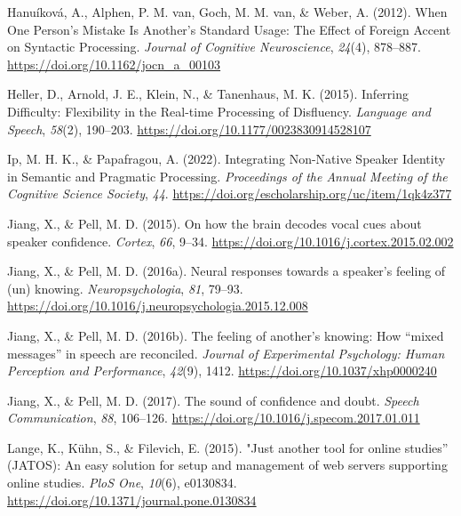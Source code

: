 \documentclass[
  man,floatsintext]{apa7}
\newlength{\cslhangindent}
\newlength{\cslentryspacingunit} %
\newenvironment{CSLReferences}[2] %
 {%
  \setlength{\parindent}{0pt}
  \ifodd #1
  \let\oldpar\par
  \def\par{\hangindent=\cslhangindent\oldpar}
  \fi
  \setlength{\parskip}{#2\cslentryspacingunit}
 }%
 {}
\begin{document}
\begin{CSLReferences}{1}{0}
\leavevmode{}%
Hanuíková, A., Alphen, P. M. van, Goch, M. M. van, \& Weber, A. (2012). When {O}ne {P}erson's {M}istake {I}s {A}nother's {S}tandard {U}sage: {T}he {E}ffect of {F}oreign {A}ccent on {S}yntactic {P}rocessing. \emph{Journal of Cognitive Neuroscience}, \emph{24}(4), 878--887. \url{https://doi.org/10.1162/jocn_a_00103}

\leavevmode{}%
Heller, D., Arnold, J. E., Klein, N., \& Tanenhaus, M. K. (2015). Inferring {D}ifficulty: {F}lexibility in the {R}eal-time {P}rocessing of {D}isfluency. \emph{Language and Speech}, \emph{58}(2), 190--203. \url{https://doi.org/10.1177/0023830914528107}

\leavevmode{}%
Ip, M. H. K., \& Papafragou, A. (2022). Integrating {N}on-{N}ative {S}peaker {I}dentity in {S}emantic and {P}ragmatic {P}rocessing. \emph{Proceedings of the Annual Meeting of the Cognitive Science Society}, \emph{44}. \url{https://doi.org/escholarship.org/uc/item/1qk4z377}

\leavevmode{}%
Jiang, X., \& Pell, M. D. (2015). On how the brain decodes vocal cues about speaker confidence. \emph{Cortex}, \emph{66}, 9--34. \url{https://doi.org/10.1016/j.cortex.2015.02.002}

\leavevmode{}%
Jiang, X., \& Pell, M. D. (2016a). Neural responses towards a speaker's feeling of (un) knowing. \emph{Neuropsychologia}, \emph{81}, 79--93. \url{https://doi.org/10.1016/j.neuropsychologia.2015.12.008}

\leavevmode{}%
Jiang, X., \& Pell, M. D. (2016b). The feeling of another's knowing: How {``mixed messages''} in speech are reconciled. \emph{Journal of Experimental Psychology: Human Perception and Performance}, \emph{42}(9), 1412. \url{https://doi.org/10.1037/xhp0000240}

\leavevmode{}%
Jiang, X., \& Pell, M. D. (2017). The sound of confidence and doubt. \emph{Speech Communication}, \emph{88}, 106--126. \url{https://doi.org/10.1016/j.specom.2017.01.011}

\leavevmode{}%
Lange, K., Kühn, S., \& Filevich, E. (2015). "{J}ust another tool for online studies'' (JATOS): An easy solution for setup and management of web servers supporting online studies. \emph{PloS One}, \emph{10}(6), e0130834. \url{https://doi.org/10.1371/journal.pone.0130834}


\end{CSLReferences}
\end{document}
